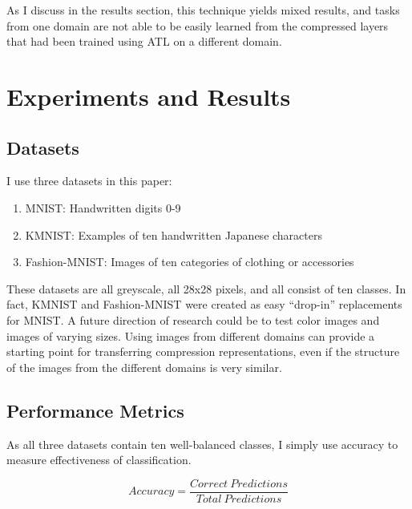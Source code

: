 \documentclass[twoside,11pt]{article}
\begin{document}
As I discuss in the results section, this technique yields mixed results, and tasks from 
one domain are not able to be easily learned from the compressed layers that had been trained
using ATL on a different domain. 










\section{Experiments and Results} \label{results}


\subsection{Datasets}

I use three datasets in this paper:

\begin{enumerate}
\item{MNIST: Handwritten digits 0-9 \citep{lecun2010mnist}}
\item{KMNIST: Examples of ten handwritten Japanese characters \citep{clanuwat2018deep}}
\item{Fashion-MNIST: Images of ten categories of clothing or accessories \citep{xiao2017fashion}}
\end{enumerate}

These datasets are all greyscale, all 28x28 pixels, and all consist of ten classes.
In fact, KMNIST and Fashion-MNIST were created as easy ``drop-in'' replacements for MNIST.
A future direction of research could be to test color images and images of varying sizes.
Using images from different domains can provide a starting point for transferring 
compression representations, even if the structure of the images from the different 
domains is very similar.

\subsection{Performance Metrics}

As all three datasets contain ten well-balanced classes, I simply use accuracy to measure
effectiveness of classification. 

\begin{equation}
Accuracy = \frac{Correct\ Predictions}{Total\ Predictions}
\end{equation}
\end{document}
